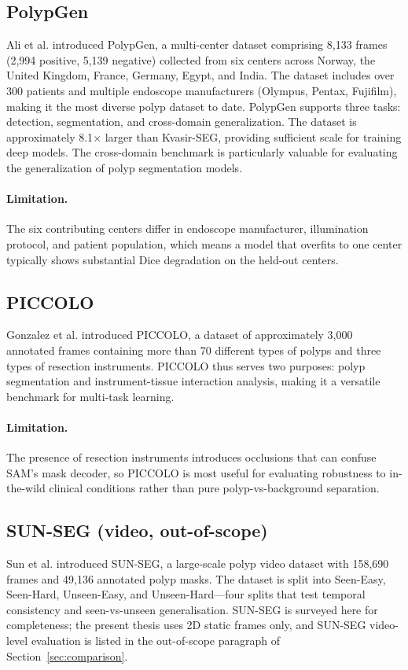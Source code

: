 \subsection{PolypGen}

Ali et al. \cite{ali2024polypgen} introduced PolypGen, a multi-center dataset comprising 8,133 frames (2,994 positive, 5,139 negative) collected from six centers across Norway, the United Kingdom, France, Germany, Egypt, and India. The dataset includes over 300 patients and multiple endoscope manufacturers (Olympus, Pentax, Fujifilm), making it the most diverse polyp dataset to date. PolypGen supports three tasks: detection, segmentation, and cross-domain generalization. The dataset is approximately 8.1$\times$ larger than Kvasir-SEG, providing sufficient scale for training deep models. The cross-domain benchmark is particularly valuable for evaluating the generalization of polyp segmentation models.

\paragraph{Limitation.} The six contributing centers differ in endoscope manufacturer, illumination protocol, and patient population, which means a model that overfits to one center typically shows substantial Dice degradation on the held-out centers.

\subsection{PICCOLO}

Gonzalez et al. \cite{gonzalez2022piccolo} introduced PICCOLO, a dataset of approximately 3,000 annotated frames containing more than 70 different types of polyps and three types of resection instruments. PICCOLO thus serves two purposes: polyp segmentation and instrument-tissue interaction analysis, making it a versatile benchmark for multi-task learning.

\paragraph{Limitation.} The presence of resection instruments introduces occlusions that can confuse SAM's mask decoder, so PICCOLO is most useful for evaluating robustness to in-the-wild clinical conditions rather than pure polyp-vs-background separation.

\subsection{SUN-SEG (video, out-of-scope)}
Sun et al. \cite{sun2022sunseg} introduced SUN-SEG, a large-scale polyp video dataset with 158,690 frames and 49,136 annotated polyp masks. The dataset is split into Seen-Easy, Seen-Hard, Unseen-Easy, and Unseen-Hard---four splits that test temporal consistency and seen-vs-unseen generalisation. SUN-SEG is surveyed here for completeness; the present thesis uses 2D static frames only, and SUN-SEG video-level evaluation is listed in the out-of-scope paragraph of Section~\ref{sec:comparison}.

